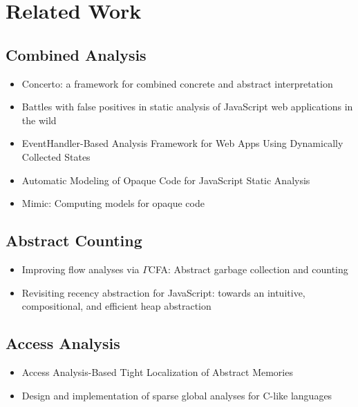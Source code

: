 \section{Related Work}

\todo

\subsection{Combined Analysis}

\begin{itemize}
  \item Concerto: a framework for combined concrete and abstract
    interpretation~\cite{concerto}
  \item Battles with false positives in static analysis of JavaScript web
    applications in the wild~\cite{battles}
  \item EventHandler-Based Analysis Framework for Web Apps Using Dynamically
    Collected States~\cite{eha}
  \item Automatic Modeling of Opaque Code for JavaScript Static
    Analysis~\cite{opaque-model}
  \item Mimic: Computing models for opaque code~\cite{mimic}
\end{itemize}

\subsection{Abstract Counting}

\begin{itemize}
  \item Improving flow analyses via $\Gamma$CFA: Abstract garbage collection and
    counting~\cite{abstract-gc-counting}
  \item Revisiting recency abstraction for JavaScript: towards an intuitive,
    compositional, and efficient heap abstraction~\cite{revisit-recency}
\end{itemize}

\subsection{Access Analysis}

\begin{itemize}
  \item Access Analysis-Based Tight Localization of Abstract
    Memories~\cite{func-local}
  \item Design and implementation of sparse global analyses for C-like
    languages~\cite{sparse}
\end{itemize}

